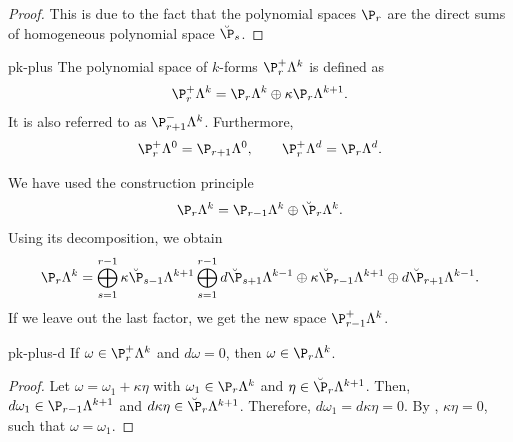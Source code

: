\begin{proof}
  This is due to the fact that the polynomial spaces $\P_r$ are the
  direct sums of homogeneous polynomial space $\breve\P_s$.
\end{proof}

\begin{Definition}{pk-plus}
  The polynomial space of $k$-forms $\P_r^+\Lambda^k$ is defined as
  \begin{gather}
    \P_r^+\Lambda^k = \P_r\Lambda^k \oplus \kappa \P_r\Lambda^{k+1}.
  \end{gather}
  It is also referred to as $\P_{r+1}^-\Lambda^k$. Furthermore,
  \begin{gather}
    \P_r^+\Lambda^0 = \P_{r+1}\Lambda^0,
    \qquad
    \P_r^+\Lambda^d = \P_r\Lambda^d.
  \end{gather}
\end{Definition}

\begin{remark}
  We have used the construction principle
  \begin{gather}
    \P_r\Lambda^k = \P_{r-1}\Lambda^k \oplus \breve \P_r\Lambda^k.
  \end{gather}
  Using its decomposition, we obtain
  \begin{gather}
    \P_r\Lambda^k =
    \bigoplus_{s=1}^{r-1}\kappa \breve\P_{s-1}\Lambda^{k+1}
    \bigoplus_{s=1}^{r-1} d\breve\P_{s+1}\Lambda^{k-1}
    \oplus \kappa \breve\P_{r-1}\Lambda^{k+1}
    \oplus d\breve\P_{r+1}\Lambda^{k-1}.
  \end{gather}
  If we leave out the last factor, we get the new space
  $\P_{r-1}^+\Lambda^k$.
\end{remark}

\begin{Lemma}{pk-plus-d}
  If $\omega\in \P_r^+\Lambda^k$ and $d\omega=0$, then
  $\omega\in\P_r\Lambda^k$.
\end{Lemma}

\begin{proof}
  Let $\omega = \omega_1 + \kappa\eta$ with $\omega_1\in\P_r\Lambda^k$
  and $\eta\in \breve\P_r\Lambda^{k+1}$. Then,
  $d\omega_1\in\P_{r-1}\Lambda^{k+1}$ and
  $d\kappa\eta\in \breve\P_r\Lambda^{k+1}$. Therefore,
  $d\omega_1 = d\kappa\eta = 0$. By
  , $\kappa\eta=0$, such that
  $\omega=\omega_1$.
\end{proof}

